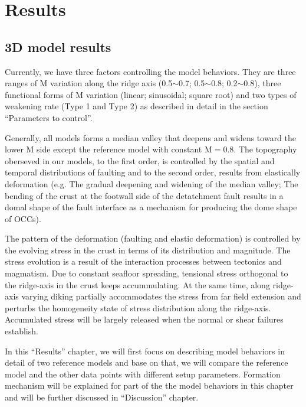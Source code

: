 \pagebreak
\section{Results}
\subsection{3D model results}
Currently, we have three factors controlling the model behaviors. They are three ranges of M variation along the ridge axis (0.5$\sim$0.7; 0.5$\sim$0.8; 0.2$\sim$0.8), three functional forms of M variation (linear; sinusoidal; square root) and two types of weakening rate (Type 1 and Type 2) as described in detail in the section ``Parameters to control''. 

Generally, all models forms a median valley that deepens and widens toward the lower M side except the reference model with constant M$=0.8$. The topography oberseved in our models, to the first order, is controlled by the spatial and temporal distributions of faulting and to the second order, results from elastically deformation (e.g. The gradual deepening and widening of the median valley; The bending of the crust at the footwall side of the detatchment fault results in a domal shape of the fault interface as a mechanism for producing the dome shape of OCCs). 

The pattern of the deformation (faulting and elastic deformation) is controlled by the evolving stress in the crust in terms of its distribution and magnitude. The stress evolution is a result of the interaction processes between tectonics and magmatism. Due to constant seafloor spreading, tensional stress orthogonal to the ridge-axis in the crust keeps accummulating. At the same time, along ridge-axis varying diking partially accommodates the stress from far field extension and perturbs the homogeneity state of stress distribution along the ridge-axis. Accumulated stress will be largely released when the normal or shear failures establish.

In this ``Results'' chapter, we will first focus on describing model behaviors in detail of two reference models and base on that, we will compare the reference model and the other data points with different setup parameters. Formation mechanism will be explained for part of the the model behaviors in this chapter and will be further discussed in ``Discussion'' chapter. 

